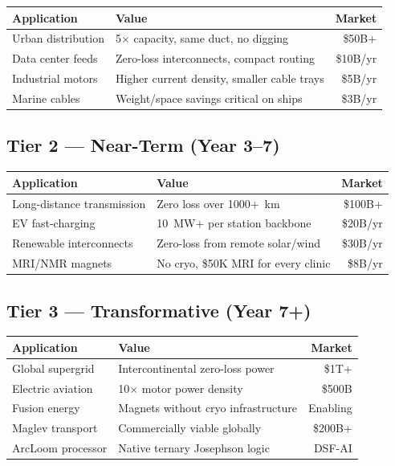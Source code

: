 \documentclass[11pt, a4paper]{article}
\begin{document}
\begin{center}
\begin{tabular}{@{}p{3.5cm}p{5cm}r@{}}
\toprule
\textbf{Application} & \textbf{Value} & \textbf{Market} \\
\midrule
Urban distribution & 5$\times$ capacity, same duct, no digging &
  \$50B+ \\
Data center feeds & Zero-loss interconnects, compact routing &
  \$10B/yr \\
Industrial motors & Higher current density, smaller cable trays &
  \$5B/yr \\
Marine cables & Weight/space savings critical on ships &
  \$3B/yr \\
\bottomrule
\end{tabular}
\end{center}

\subsection{Tier 2 --- Near-Term (Year 3--7)}

\begin{center}
\begin{tabular}{@{}p{3.5cm}p{5cm}r@{}}
\toprule
\textbf{Application} & \textbf{Value} & \textbf{Market} \\
\midrule
Long-distance transmission & Zero loss over 1000+~km & \$100B+ \\
EV fast-charging & 10~MW+ per station backbone & \$20B/yr \\
Renewable interconnects & Zero-loss from remote solar/wind & \$30B/yr \\
MRI/NMR magnets & No cryo, \$50K MRI for every clinic & \$8B/yr \\
\bottomrule
\end{tabular}
\end{center}

\subsection{Tier 3 --- Transformative (Year 7+)}

\begin{center}
\begin{tabular}{@{}p{3.5cm}p{5cm}r@{}}
\toprule
\textbf{Application} & \textbf{Value} & \textbf{Market} \\
\midrule
Global supergrid & Intercontinental zero-loss power & \$1T+ \\
Electric aviation & 10$\times$ motor power density & \$500B \\
Fusion energy & Magnets without cryo infrastructure & Enabling \\
Maglev transport & Commercially viable globally & \$200B+ \\
ArcLoom processor & Native ternary Josephson logic & DSF-AI \\
\bottomrule
\end{tabular}
\end{center}
\end{document}
